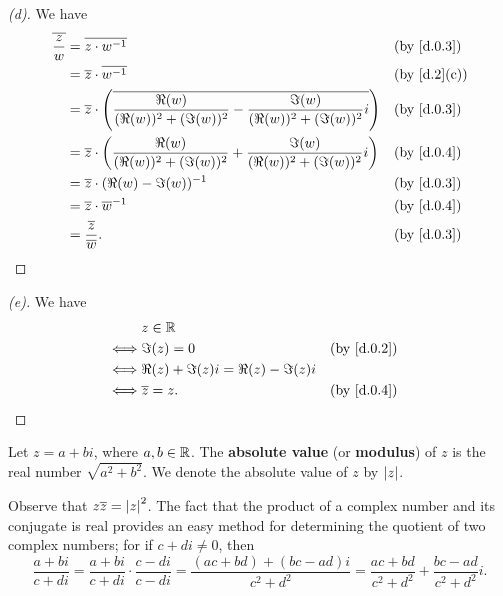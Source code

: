 \begin{proof}[(d)]
	We have
	\begin{align*}
		\conj{\frac{z}{w}} & = \conj{z \cdot w^{-1}}                                                                                        &  & \by{d.0.3}  \\
		                   & = \conj{z} \cdot \conj{w^{-1}}                                                                                 &  & \by{d.2}[c] \\
		                   & = \conj{z} \cdot \pa{\conj{\frac{\Re(w)}{(\Re(w))^2 + (\Im(w))^2} - \frac{\Im(w)}{(\Re(w))^2 + (\Im(w))^2} i}} &  & \by{d.0.3}  \\
		                   & = \conj{z} \cdot \pa{\frac{\Re(w)}{(\Re(w))^2 + (\Im(w))^2} + \frac{\Im(w)}{(\Re(w))^2 + (\Im(w))^2} i}        &  & \by{d.0.4}  \\
		                   & = \conj{z} \cdot (\Re(w) - \Im(w))^{-1}                                                                        &  & \by{d.0.3}  \\
		                   & = \conj{z} \cdot \conj{w}^{-1}                                                                                 &  & \by{d.0.4}  \\
		                   & = \frac{\conj{z}}{\conj{w}}.                                                                                   &  & \by{d.0.3}
	\end{align*}
\end{proof}

\begin{proof}[(e)]
	We have
	\begin{align*}
		     & z \in \R                                              \\
		\iff & \Im(z) = 0                            &  & \by{d.0.2} \\
		\iff & \Re(z) + \Im(z) i = \Re(z) - \Im(z) i                 \\
		\iff & \conj{z} = z.                         &  & \by{d.0.4}
	\end{align*}
\end{proof}

\begin{defn}\label{d.0.5}
	Let \(z = a + bi\), where \(a, b \in \mathbb{R}\).
	The \textbf{absolute value} (or \textbf{modulus}) of \(z\) is the real number \(\sqrt{a^2 + b^2}\).
	We denote the absolute value of \(z\) by \(\left\lvert z\right\rvert\).

	Observe that \(z \overline{z} = \left\lvert z\right\rvert^2\).
	The fact that the product of a complex number and its conjugate is real provides an easy method for determining the quotient of two complex numbers;
	for if \(c + di \neq 0\), then
	\[
		\frac{a + bi}{c + di} = \frac{a + bi}{c + di} \cdot \frac{c - di}{c - di} = \frac{(ac + bd) + (bc - ad) i}{c^2 + d^2} = \frac{ac + bd}{c^2 + d^2} + \frac{bc - ad}{c^2 + d^2} i.
	\]
\end{defn}

